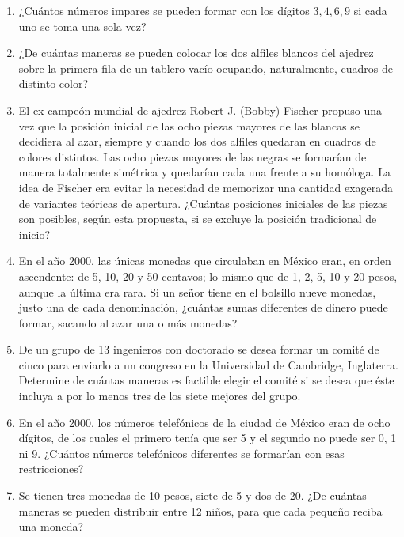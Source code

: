 \begin{Ejer}
\begin{enumerate}

\item ¿Cu\'antos n\'umeros impares se pueden formar con los d\'igitos $3,4,6,9$ si cada uno se toma una sola vez?

\item ¿De cu\'antas maneras se pueden colocar los dos alfiles blancos del ajedrez sobre la primera fila de un tablero vac\'io ocupando, naturalmente, cuadros de distinto color?

\item El ex campe\'on mundial de ajedrez Robert J. (Bobby) Fischer propuso una vez que la posici\'on inicial de las ocho piezas mayores de las blancas se decidiera al azar, siempre y cuando los dos alfiles quedaran en cuadros de colores distintos. Las ocho piezas mayores de las negras se formar\'ian de manera totalmente sim\'etrica y quedar\'ian cada una frente a su hom\'ologa. La idea de Fischer era evitar la necesidad de memorizar una cantidad exagerada de variantes te\'oricas de apertura. ¿Cu\'antas posiciones iniciales de las piezas son posibles, seg\'un esta propuesta, si se excluye la posici\'on tradicional de inicio?

\item En el a\~no 2000, las \'unicas monedas que circulaban en M\'exico eran, en orden ascendente: de 5, 10, 20 y 50 centavos; lo mismo que de 1, 2, 5, 10 y 20 pesos, aunque la \'ultima era rara. Si un se\~nor tiene en el bolsillo nueve monedas, justo una de cada denominaci\'on, ¿cu\'antas sumas diferentes de dinero puede formar, sacando al azar una o m\'as monedas?

\item De un grupo de 13 ingenieros con doctorado se desea formar un comit\'e de cinco para enviarlo a un congreso en la Universidad de Cambridge, Inglaterra. Determine de cu\'antas maneras es factible elegir el comit\'e si se desea que \'este incluya a por lo menos tres de los siete mejores del grupo.

\item En el a\~no 2000, los n\'umeros telef\'onicos de la ciudad de M\'exico eran de ocho d\'igitos, de los cuales el primero ten\'ia que ser 5 y el segundo no puede ser 0, 1 ni 9. ¿Cu\'antos n\'umeros telef\'onicos diferentes se formar\'ian con esas restricciones?

\item Se tienen tres monedas de 10 pesos, siete de 5 y dos de 20. ¿De cu\'antas maneras se pueden distribuir entre 12 ni\~nos, para que cada peque\~no reciba una moneda?


\end{enumerate}
\end{Ejer}
